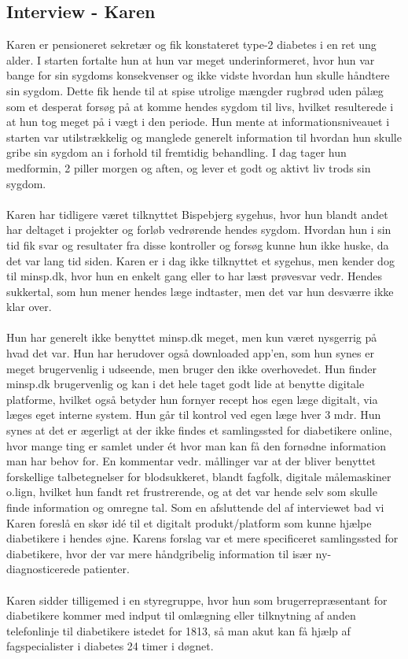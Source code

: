 \subsection*{Interview - Karen}
Karen er pensioneret sekretær og fik konstateret type-2 diabetes i en ret ung alder. I starten fortalte hun at hun var meget underinformeret, hvor hun var bange for sin sygdoms konsekvenser og ikke vidste hvordan hun skulle håndtere sin sygdom. Dette fik hende til at spise utrolige mængder rugbrød uden pålæg som et desperat forsøg på at komme hendes sygdom til livs, hvilket resulterede i at hun tog meget på i vægt i den periode. Hun mente at informationsniveauet i starten var utilstrækkelig og manglede generelt information til hvordan hun skulle gribe sin sygdom an i forhold til fremtidig behandling. I dag tager hun medformin, 2 piller morgen og aften, og lever et godt og aktivt liv trods sin sygdom.
\\ \\
Karen har tidligere været tilknyttet Bispebjerg sygehus, hvor hun blandt andet har deltaget i projekter og forløb vedrørende hendes sygdom. Hvordan hun i sin tid fik svar og resultater fra disse kontroller og forsøg kunne hun ikke huske, da det var lang tid siden. Karen er i dag ikke tilknyttet et sygehus, men kender dog til minsp.dk, hvor hun en enkelt gang eller to har læst prøvesvar vedr. Hendes sukkertal, som hun mener hendes læge indtaster, men det var hun desværre ikke klar over. 
\\ \\
Hun har generelt ikke benyttet minsp.dk meget, men kun været nysgerrig på hvad det var. Hun har herudover også downloaded app'en, som hun synes er meget brugervenlig i udseende, men bruger den ikke overhovedet. Hun finder minsp.dk brugervenlig og kan i det hele taget godt lide at benytte digitale platforme, hvilket også betyder hun fornyer recept hos egen læge digitalt, via læges eget interne system. Hun går til kontrol ved egen læge hver 3 mdr. Hun synes at det er ægerligt at der ikke findes et samlingssted for diabetikere online, hvor mange ting er samlet under ét hvor man kan få den fornødne information man har behov for. En kommentar vedr. mållinger var at der bliver benyttet forskellige talbetegnelser for blodsukkeret, blandt fagfolk, digitale målemaskiner o.lign, hvilket hun fandt ret frustrerende, og at det var hende selv som skulle finde information og omregne tal. 
Som en afsluttende del af interviewet bad vi Karen foreslå en skør idé til et digitalt produkt/platform som kunne hjælpe diabetikere i hendes øjne. Karens forslag var et mere specificeret samlingssted for diabetikere, hvor der var mere håndgribelig information til især ny-diagnosticerede patienter.
\\ \\
Karen sidder tilligemed i en styregruppe, hvor hun som brugerrepræsentant for diabetikere kommer med indput til omlægning eller tilknytning af anden telefonlinje til diabetikere istedet for 1813, så man akut kan få hjælp af fagspecialister i diabetes 24 timer i døgnet.

